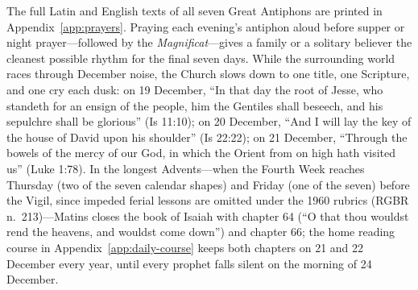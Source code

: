 The full Latin and English texts of all seven Great Antiphons are printed in
Appendix~\ref{app:prayers}. Praying each evening's antiphon aloud before supper
or night prayer---followed by the \textit{Magnificat}---gives a family or a
solitary believer the cleanest possible rhythm for the final seven days. While
the surrounding world races through December noise, the Church slows down to
one title, one Scripture, and one cry each dusk: on 19 December, ``In that day
the root of Jesse, who standeth for an ensign of the people, him the Gentiles
shall beseech, and his sepulchre shall be glorious'' (Is 11:10); on 20
December, ``And I will lay the key of the house of David upon his shoulder''
(Is 22:22); on 21 December, ``Through the bowels of the mercy of our God, in
which the Orient from on high hath visited us'' (Luke 1:78). In the longest
Advents---when the Fourth Week reaches Thursday (two of the seven calendar
shapes) and Friday (one of the seven) before the Vigil, since impeded ferial
lessons are omitted under the 1960 rubrics (RGBR n.~213)---Matins closes the
book of Isaiah with chapter 64 (``O that thou wouldst rend the heavens, and
wouldst come down'') and chapter 66; the home reading course in
Appendix~\ref{app:daily-course} keeps both chapters on 21 and 22 December every
year, until every prophet falls silent on the morning of 24 December.
